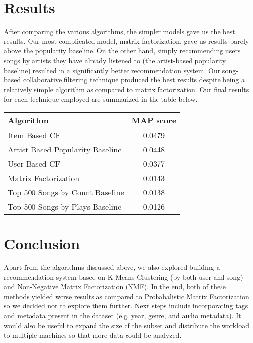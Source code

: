 \documentclass[12pt,preprint]{aastex}
\begin{document}



\section{Results}
After comparing the various algorithms, the simpler models gave us the best results. Our most complicated model, matrix factorization, gave us results barely above the popularity baseline. On the other hand, simply recommending users songs by artists they have already listened to (the artist-based popularity baseline) resulted in a significantly better recommendation system. Our song-based collaborative filtering technique produced the best results despite being a relatively simple algorithm as compared to matrix factorization. Our final results for each technique employed are summarized in the table below. 

\begin{table}[h]
\begin{center}
\begin{tabular}{lc}

\hline
\bf{Algorithm} &  \bf{MAP score}\\ \hline
Item Based  CF  &  0.0479 \\ 
Artist Based Popularity Baseline  & 0.0448    \\ 
User Based  CF  &  0.0377 \\ 
Matrix Factorization  &   0.0143  \\ 
Top 500 Songs by Count  Baseline &  0.0138  \\ 
Top 500 Songs by Plays  Baseline &  0.0126  \\ 
\end{tabular}
\end{center}
\end{table}

\section{Conclusion}
Apart from the algorithms discussed above, we also explored building a recommendation system based on K-Means Clustering (by both user and song) and Non-Negative Matrix Factorization (NMF). In the end, both of these methods yielded worse results as compared to Probabalistic Matrix Factorization so we decided not to explore them further. Next steps include incorporating tags and metadata present in the dataset (e.g. year, genre, and audio metadata). It would also be useful to expand the size of the subset and distribute the workload to multiple machines so that more data could be analyzed.
\end{document}
